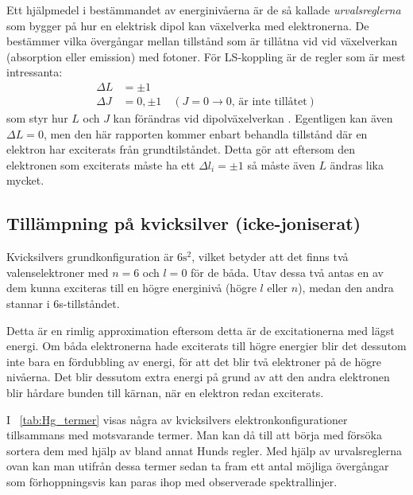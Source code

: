 \documentclass[11pt,a4paper]{article}
\newcommand{\tabref}{\tablename~\ref} %
\begin{document}
Ett hjälpmedel i bestämmandet av energinivåerna är de så
kallade \emph{urvalsreglerna} som bygger på hur en elektrisk dipol kan
växelverka med elektronerna. De bestämmer vilka övergångar mellan
tillstånd som är tillåtna vid vid växelverkan (absorption eller
emission) med fotoner. För LS-koppling är de regler som är mest intressanta:  
\begin{equation*}
\begin{aligned}
\Delta L &= \pm 1 \\
\Delta J &= 0, \pm 1 \quad (J=0\to 0\text{, är inte tillåtet})
\end{aligned}
\end{equation*}
som styr hur $L$ och $J$ kan förändras vid dipolväxelverkan \cite{Bransden}. Egentligen kan även $\Delta L=0$, men den här rapporten kommer enbart  behandla tillstånd där en elektron har exciterats från grundtilståndet. Detta gör att eftersom den elektronen som exciterats måste ha ett $\Delta l_i =\pm 1$ 
\cite{Bransden} så måste även $L$ ändras lika mycket.


\subsection{Tillämpning på kvicksilver (icke-joniserat)}
Kvicksilvers grundkonfiguration är $6\mathrm{s}^2$, vilket betyder att det
finns två valenselektroner med $n=6$ och $l=0$ för de båda. Utav dessa
två antas en av dem kunna exciteras till en högre energinivå (högre
$l$ eller $n$), medan den andra stannar i 6s-tillståndet. 

Detta är en rimlig approximation eftersom detta är de excitationerna
med lägst energi. Om båda elektronerna hade exciterats till högre
energier blir det dessutom inte bara en fördubbling av energi, för att
det blir två elektroner på de högre nivåerna. Det blir dessutom extra
energi på grund av att den andra elektronen blir hårdare bunden till
kärnan, när en elektron redan exciterats. 

I \tabref{tab:Hg_termer} visas några av kvicksilvers
elektronkonfigurationer tillsammans med motsvarande termer. Man kan då
till att börja med försöka sortera dem med hjälp av bland annat Hunds
regler. 
Med hjälp av urvalsreglerna ovan kan man utifrån dessa termer sedan 
ta fram ett antal möjliga övergångar som förhoppningsvis kan paras ihop
med observerade spektrallinjer. 
\end{document}
